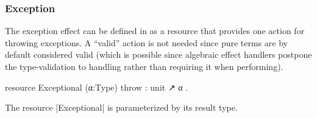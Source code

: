 %
%
%
%
%
%
%
%
% 
%

%
%
%
%

\subsubsection{Exception}
%
The exception effect can be defined in \LangD as a resource that provides one action for throwing exceptions.
A ``valid'' action is not needed since pure terms are by default considered valid (which is possible since algebraic effect handlers postpone the type-validation to handling rather than requiring it when performing).
%
\begin{program}[caption={Resource for exception}]
resource Exceptional (α:Type) { throw : unit ↗ α }.
\end{program}
%
The resource \code|Exceptional| is parameterized by its result type.

